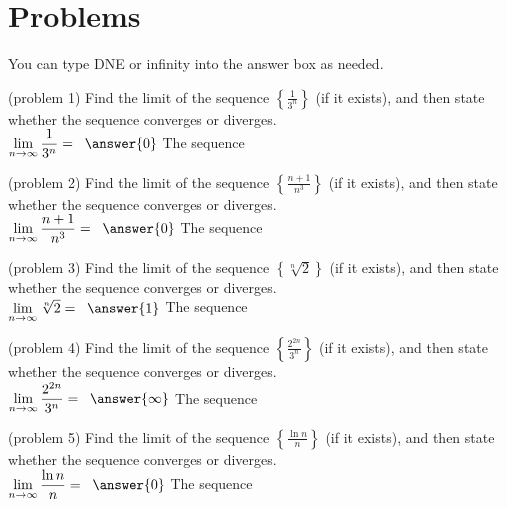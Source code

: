 \documentclass[handout]{ximera}
\begin{document}
\section{Problems}
You can type DNE or infinity into the answer box as needed.

\begin{problem}(problem 1)
Find the limit of the sequence $\displaystyle \left\{\frac{1}{3^n}\right\}$ (if it exists), and then state whether the sequence converges or diverges.\\
$\displaystyle \lim_{n\to \infty} \frac{1}{3^n} = \;\;\answer{0}$ \quad
The sequence 
\end{problem}

\begin{problem}(problem 2)
Find the limit of the sequence $\displaystyle \left\{\frac{n+1}{n^3}\right\}$ (if it exists), and then state whether the sequence converges or diverges.\\
$\displaystyle \lim_{n\to \infty} \frac{n+1}{n^3} = \;\;\answer{0}$ \quad
The sequence 
\end{problem}

\begin{problem}(problem 3)
Find the limit of the sequence $\displaystyle \left\{\sqrt[n]{2}\right\}$ (if it exists), and then state whether the sequence converges or diverges.\\
$\displaystyle \lim_{n\to \infty} \sqrt[n]2 = \;\;\answer{1}$ \;\;
The sequence 
\end{problem}

\begin{problem}(problem 4)
Find the limit of the sequence $\displaystyle \left\{\frac{2^{2n}}{3^n}\right\}$ (if it exists), and then state whether the sequence converges or diverges.\\
$\displaystyle \lim_{n\to \infty} \frac{2^{2n}}{3^n} = \;\;\answer{\infty}$ \quad
The sequence 
\end{problem}

\begin{problem}(problem 5)
Find the limit of the sequence $\displaystyle \left\{\frac{\ln n}{n}\right\}$ (if it exists), and then state whether the sequence converges or diverges.\\
$\displaystyle \lim_{n\to \infty} \frac{\ln n}{n} = \;\;\answer{0}$ \quad
The sequence 
\end{problem}
\end{document}
